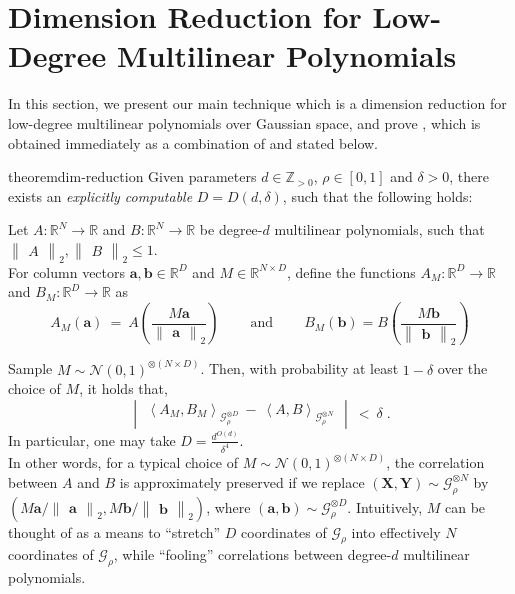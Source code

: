 \documentclass[11pt]{article}
\newcommand{\inparen}[1]{\left ( #1 \right )}
\newcommand{\inangle}[1]{\left \langle #1 \right \rangle}
\newcommand{\inabs}[1]{\begin{vmatrix} #1 \end{vmatrix}}
\newcommand{\norm}[2]{\begin{Vmatrix} #2 \end{Vmatrix}_{#1}}
\newcommand{\sAND}{\ \mathrm{and} \ }
\newcommand{\bbR}{{\mathbb R}}
\newcommand{\bbZ}{{\mathbb Z}}
\newcommand{\ba}{{\bm a}}
\newcommand{\bb}{{\bm b}}
\newcommand{\bX}{\mathbf{X}}
\newcommand{\bY}{\mathbf{Y}}
\newcommand{\calG}{\mathcal{G}}
\newcommand{\calN}{\mathcal{N}}
\begin{document}

\section{Dimension Reduction for Low-Degree Multilinear Polynomials} \label{sec:dim-reduction}

In this section, we present our main technique which is a dimension reduction for low-degree multilinear polynomials over Gaussian space, and prove , which is obtained immediately as a combination of  and  stated below.

\begin{restatable}{theorem}{dim-reduction}\label{thm:dim-reduction}
	Given parameters $d \in \bbZ_{> 0}$, $\rho \in [0,1]$ and $\delta > 0$, there exists an \emph{explicitly computable} $D = D(d, \delta)$, such that the following holds:
	
	Let $A: \bbR^N \to \bbR$ and $B: \bbR^N \to \bbR$ be degree-$d$ multilinear polynomials, such that $\norm{2}{A}, \norm{2}{B} \le 1$.\\
	For column vectors $\ba, \bb \in \bbR^D$ and $M \in \bbR^{N \times D}$, define the functions $A_M : \bbR^D \to \bbR$ and $B_M : \bbR^D \to \bbR$ as
	\[A_M(\ba) ~=~ A\inparen{\frac{M \ba}{\norm{2}{\ba}}} \qquad \sAND \qquad B_M(\bb) = B\inparen{\frac{M \bb}{\norm{2}{\bb}}}\]
	
	\noindent Sample $M \sim \calN(0,1)^{\otimes (N \times D)}$. Then, with probability at least $1-\delta$ over the choice of $M$, it holds that,
	\[\inabs{\inangle{A_M, B_M}_{\calG_{\rho}^{\otimes D}} ~-~ \inangle{A, B}_{\calG_{\rho}^{\otimes N}}} ~<~ \delta\;.\]
	In particular, one may take $D = \frac{d^{O(d)}}{\delta^4}$.\\
	
	\noindent In other words, for a typical choice of $M \sim \calN(0,1)^{\otimes (N \times D)}$, the correlation between $A$ and $B$ is approximately preserved if we replace $(\bX,\bY) \sim \calG_{\rho}^{\otimes N}$ by $(M \ba/\norm{2}{\ba}, M \bb/\norm{2}{\bb})$, where $(\ba, \bb) \sim \calG_{\rho}^{\otimes D}$. Intuitively, $M$ can be thought of as a means to ``stretch'' $D$ coordinates of $\calG_{\rho}$ into effectively $N$ coordinates of $\calG_{\rho}$, while ``fooling'' correlations between degree-$d$ multilinear polynomials.
\end{restatable}
\end{document}
